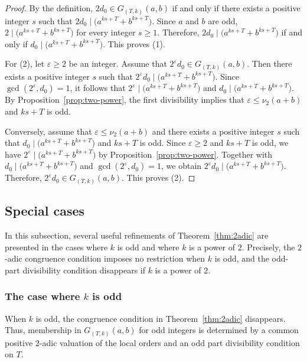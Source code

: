\documentclass[pdflatex,sn-mathphys-num]{sn-jnl}%
\theoremstyle{thmstyleone}%
\theoremstyle{thmstyletwo}%
\theoremstyle{thmstylethree}%
\begin{document}
\begin{proof}
 By the  definition,
$
2d_0\in G_{(T,k)}(a,b)
$
if and only if there exists a positive  integer $s$ such that
$
2d_0\mid \bigl(a^{ks+T}+b^{ks+T}\bigr)$.
Since $a$ and $b$ are odd,
$
2\mid \bigl(a^{ks+T}+b^{ks+T}\bigr)$
for every integer $s\ge 1$. Therefore, $
2d_0\mid \bigl(a^{ks+T}+b^{ks+T}\bigr)$
if and only if
$
d_0\mid \bigl(a^{ks+T}+b^{ks+T}\bigr)$. 
This proves (1).

For \textup{(2)}, let $\varepsilon\ge 2$ be an integer. Assume that
$
2^\varepsilon d_0\in G_{(T,k)}(a,b)$.
Then there exists a positive  integer $s$ such that
$
2^\varepsilon d_0\mid \bigl(a^{ks+T}+b^{ks+T}\bigr)$.
Since $
\gcd(2^\varepsilon,d_0)=1$,
it follows that $
2^\varepsilon\mid \bigl(a^{ks+T}+b^{ks+T}\bigr)$ and $ 
d_0\mid \bigl(a^{ks+T}+b^{ks+T}\bigr)$.
By Proposition~\ref{prop:two-power}, the first divisibility implies that $\varepsilon\le \nu_2(a+b)$ and $
ks+T$ is odd.
 

Conversely, assume that $\varepsilon\le \nu_2(a+b)$  and there exists a positive integer $s$ such that $
d_0\mid \bigl(a^{ks+T}+b^{ks+T}\bigr)$ and $
ks+T$  is odd. 
Since $\varepsilon\ge 2$ and $ks+T$ is odd, we have   $
2^\varepsilon\mid \bigl(a^{ks+T}+b^{ks+T}\bigr)$ by Proposition~\ref{prop:two-power}. 
Together with $
d_0\mid \bigl(a^{ks+T}+b^{ks+T}\bigr)$ 
and $
\gcd(2^\varepsilon,d_0)=1$,
we obtain
$
2^\varepsilon d_0\mid \bigl(a^{ks+T}+b^{ks+T}\bigr)$.
Therefore, 
$
2^\varepsilon d_0\in G_{(T,k)}(a,b)$. 
This proves \textup{(2)}.
\end{proof}

 

 
 
\subsection{Special cases}

In this subsection, several useful refinements of Theorem~\ref{thm:2adic} are presented in the cases where $k$ is odd and where $k$ is a power of $2$. Precisely, the $2$-adic congruence condition imposes no restriction when $k$ is odd, and  the odd-part divisibility condition disappears if $k$ is a power of $2$.  

\subsubsection{The case where $k$ is odd}

When $k$ is odd, the congruence condition in Theorem~\ref{thm:2adic} disappears. Thus, membership in $G_{(T,k)}(a,b)$ for odd integers is  determined  by a common positive $2$-adic valuation of the local orders and an odd part divisibility condition on $T$.
\end{document}
